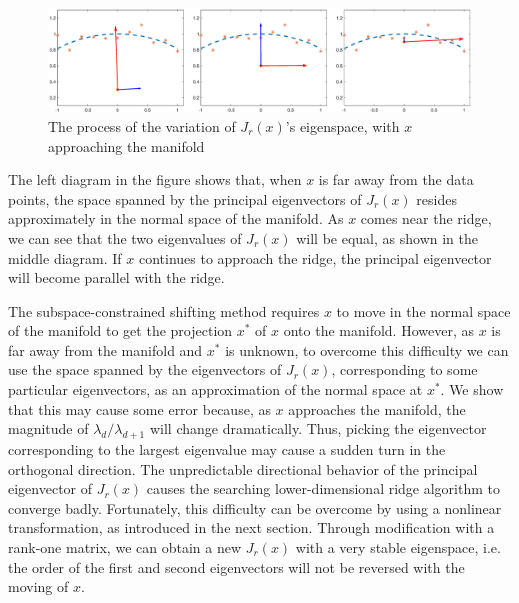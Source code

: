\documentclass[aos,preprint]{imsart}
\theoremstyle{remark}
\begin{document}
\begin{figure}[h] %
\includegraphics[width=\linewidth]{demo123.eps} 
\caption{The process of the variation of $J_r(x)$'s eigenspace, with $x$ approaching the manifold }
\label{Shifting Eigenvectors}
\end{figure}

The left diagram in the figure shows that, when $x$ is far away from the data points, the space spanned by the principal eigenvectors of $J_r(x)$ resides approximately in the normal space of the manifold. As $x$ comes near the ridge, we can see that the two eigenvalues of $J_r(x)$ will be equal, as shown in the middle diagram. If $x$ continues to approach the ridge, the principal eigenvector will become parallel with the ridge.

The subspace-constrained shifting method requires $x$ to move in the normal space of the manifold to get the projection $x^*$ of $x$ onto the manifold. However, as $x$ is far away from the manifold and $x^*$ is unknown, to overcome this difficulty we can use the space spanned by the eigenvectors of $J_r(x)$, corresponding to some particular eigenvectors, as an approximation of the normal space at $x^*$. We show that this may cause some error because, as $x$ approaches the manifold, the magnitude of $\lambda_d/\lambda_{d+1}$ will change dramatically. Thus, picking the eigenvector corresponding to the largest eigenvalue may cause a sudden turn in the orthogonal direction. The unpredictable directional behavior of the principal eigenvector of $J_r(x)$ causes the searching lower-dimensional ridge algorithm to converge badly. Fortunately, this difficulty can be overcome by using a nonlinear transformation, as introduced in the next section. Through modification with a rank-one matrix, we can obtain a new $J_r(x)$ with a very stable eigenspace, i.e. the order of the first and second eigenvectors will not be reversed with the moving of $x$. %
\end{document}
